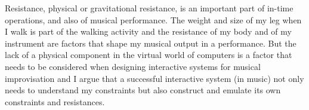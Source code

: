 \documentclass{article}
\begin{document}
Resistance, physical or gravitational resistance, is an important part of in-time operations, and also of musical performance. The weight and size of my leg when I walk is part of the walking activity and the resistance of my body and of my instrument are factors that shape my musical output in a performance. But the lack of a physical component in the virtual world of computers is a factor that needs to be considered when designing interactive systems for musical improvisation and I argue that a successful interactive system (in music) not only needs to understand my constraints but also construct and emulate its own constraints and resistances.



\end{document}
